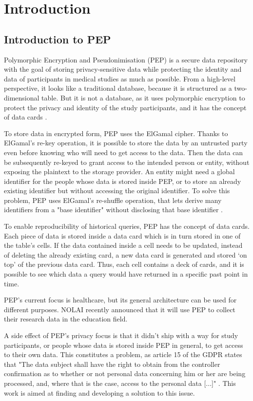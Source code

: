 \documentclass{report}
\begin{document}
\tableofcontents
\pagebreak

\chapter{Introduction}
\section{Introduction to PEP}
Polymorphic Encryption and Pseudonimisation (PEP) is a secure data repository with the goal of storing privacy-sensitive data while protecting the identity and data of participants
in medical studies as much as possible. From a high-level perspective, it looks like a traditional database, because it is structured as a two-dimensional table. But it is not a 
database, as it uses polymorphic encryption to protect the privacy and identity of the study participants, and it has the concept of data cards \cite{pep-blueprint}.\par
To store data in encrypted form, PEP uses the ElGamal cipher. Thanks to ElGamal's re-key operation, it is possible to store the data by an untrusted party even before knowing who
will need to get access to the data. Then the data can be subsequently re-keyed to grant access to the intended person or entity, without exposing the plaintext to the storage provider.
An entity might need a global identifier for the people whose data is stored inside PEP, or to store an already existing identifier but without accessing the original identifier. To
solve this problem, PEP uses ElGamal's re-shuffle operation, that lets derive many identifiers from a "base identifier" without disclosing that base identifier \cite{peppaper}.\par
To enable reproducibility of historical queries, PEP has the concept of data cards. Each piece of data is stored inside a data card which is in turn stored in one of the table's
cells. If the data contained inside a cell needs to be updated, instead of deleting the already existing card, a new data card is generated and stored \enquote*{on top} of the previous data
card. Thus, each cell contains a deck of cards, and it is possible to see which data a query would have returned in a specific past point in time. \par
PEP's current focus is healthcare, but its general architecture can be used for different purposes. NOLAI \cite{nolai} \cite{pepproject} recently announced that it will use PEP to
collect their research data in the education field. \par
A side effect of PEP's privacy focus is that it didn't ship with a way for study participants, or people whose data is stored inside PEP in general, to get access to their own
data. This constitutes a problem, as article 15 of the GDPR states that "The data subject shall have the right to obtain from the controller confirmation as to whether or not
personal data concerning him or her are being processed, and, where that is the case, access to the personal data [...]" \cite{gdpr-art-15}. 
This work is aimed at finding and developing a solution to this issue.
\end{document}
